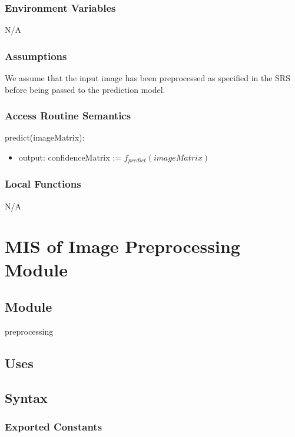 \documentclass[12pt, titlepage]{article}
\begin{document}
\subsubsection{Environment Variables}

N/A

\subsubsection{Assumptions}

We assume that the input image has been preprocessed as specified in the SRS
before being passed to the prediction model.


\subsubsection{Access Routine Semantics}

\noindent predict(imageMatrix):
\begin{itemize}
\item output: confidenceMatrix := $f_{predict}(imageMatrix)$
\end{itemize}



\subsubsection{Local Functions}

N/A

\section{MIS of Image Preprocessing Module} \label{mPreprocessing}

\subsection{Module}

preprocessing

\subsection{Uses}

\subsection{Syntax}

\subsubsection{Exported Constants}
\end{document}
